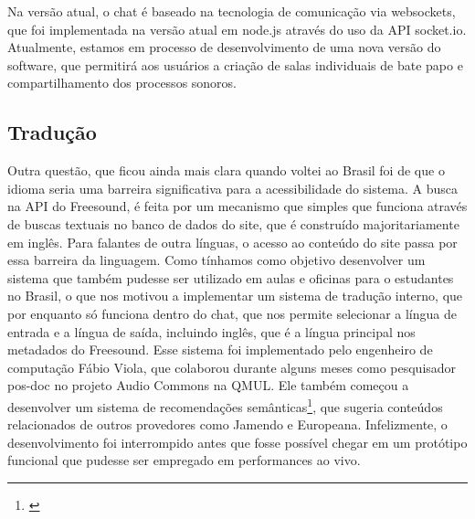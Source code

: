 Na versão atual, o chat é baseado na tecnologia de comunicação via websockets, que foi implementada na versão atual em node.js através do uso da API socket.io. Atualmente, estamos em processo de desenvolvimento de uma nova versão do software, que permitirá aos usuários a criação de salas individuais de bate papo e compartilhamento dos processos sonoros.








\subsection{Tradução}

Outra questão, que ficou ainda mais clara quando voltei ao Brasil foi de que o idioma seria uma barreira significativa para a acessibilidade do sistema. A busca na API do Freesound, é feita por um mecanismo que simples que funciona através de buscas textuais no banco de dados do site, que é construído majoritariamente em inglês. Para falantes de outra línguas, o acesso ao conteúdo do site passa por essa barreira da linguagem. Como tínhamos como objetivo desenvolver um sistema que também pudesse ser utilizado em aulas e oficinas para o estudantes no Brasil, o que nos motivou a implementar um sistema de tradução interno, que por enquanto só funciona dentro do chat, que nos permite selecionar a língua de entrada e a língua de saída, incluindo inglês, que é a língua principal nos metadados do Freesound. Esse sistema foi implementado pelo engenheiro de computação Fábio Viola, que colaborou durante alguns meses como pesquisador pos-doc no projeto Audio Commons na QMUL. Ele também começou a desenvolver um sistema de recomendações semânticas\footnote{\cite{Viola2018}}, que sugeria conteúdos relacionados de outros provedores como Jamendo e Europeana. Infelizmente, o desenvolvimento foi interrompido antes que fosse possível chegar em um protótipo funcional que pudesse ser empregado em performances ao vivo.

